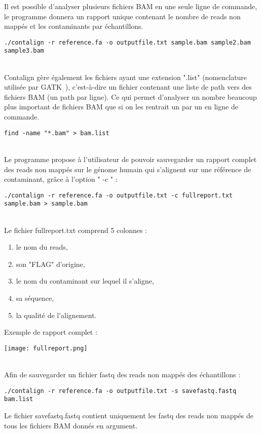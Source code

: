 \documentclass[a4paper,12pt]{article}
\begin{document}
Il est possible d'analyser plusieurs fichiers BAM en une seule ligne de commande, le programme donnera un rapport unique contenant le nombre de reads non mappés et les contaminants par échantillons. 
\begin{lstlisting}
./contalign -r reference.fa -o outputfile.txt sample.bam sample2.bam sample3.bam
\end{lstlisting} 
~\\
Contalign gère également les fichiers ayant une extension ".list" (nomenclature utilisée par GATK~\cite{gatk}), c'est-à-dire un fichier contenant une liste de path vers des fichiers BAM (un path par ligne). Ce qui permet d'analyser un nombre beaucoup plus important de fichiers BAM que si on les rentrait un par un en ligne de commande.
\begin{lstlisting}
find -name "*.bam" > bam.list
\end{lstlisting} 
~\\
Le programme propose à l'utilisateur de pouvoir sauvegarder un rapport complet des reads non mappés sur le génome humain qui s'alignent sur une référence de contaminant, grâce à l'option " -c " :
\begin{lstlisting}
./contalign -r reference.fa -o outputfile.txt -c fullreport.txt sample.bam > sample.bam\end{lstlisting}
~\\
Le fichier fullreport.txt comprend 5 colonnes :
\begin{enumerate}
\item le nom du reads,
\item son "FLAG" d'origine,
\item le nom du contaminant sur lequel il s'aligne, 
\item sa séquence,
\item la qualité de l'alignement.
\end{enumerate}
\clearpage
Exemple de rapport complet : 
\begin{center}
 \texttt{[image: fullreport.png]}
\end{center}
~\\
Afin de sauvegarder un fichier fastq des reads non mappés des échantillons : 
\begin{lstlisting}
./contalign -r reference.fa -o outputfile.txt -s savefastq.fastq bam.list \end{lstlisting}
Le fichier savefastq.fastq contient uniquement les fastq des reads non mappés de tous les fichiers BAM donnés en argument. \\
\end{document}
